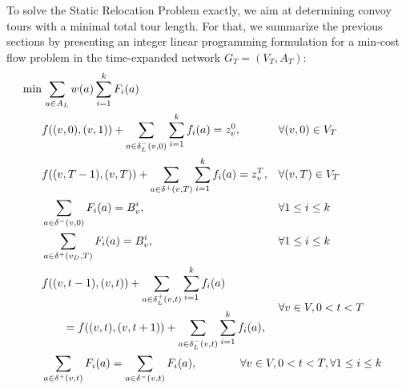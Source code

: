 \documentclass[english]{llncs}
\numberwithin{sublemma}{lemma}
\newcommand{\fc}{\ensuremath{f}}
\newcommand{\fd}{\ensuremath{F}}
\newcommand{\bd}{\ensuremath{B}}
\begin{document}
To solve the Static Relocation Problem exactly, we aim at determining convoy tours with a minimal total tour length.
For that, we summarize the previous sections by presenting an integer linear programming formulation for a min-cost flow problem in the time-expanded network $G_T = (V_T, A_T)$:
\begin{subequations}\label{eq: static: min-cost flows: ilp: wo pre w back}
  \begin{flalign}
    \min& \,  \sum_{a\in A_L} w(a) \sum_{i = 1}^k \fd_i(a)                                                                                                      \label{eq: static: min-cost flows: ilp: wo pre w back: 1}\\
    & \fc((v, 0), (v, 1)) + \sum_{a\in \delta^-_L(v,0)} \sum_{i=1}^k \fc_i(a) = z_v^0,                           && \forall (v,0) \in V_T                       \label{eq: static: min-cost flows: ilp: wo pre w back: 10}\\
    & \fc((v,T-1),(v,T)) + \sum_{a\in \delta^+(v,T)} \sum_{i=1}^k \fc_i(a) = z_v^T,                              && \forall (v,T) \in V_T                       \label{eq: static: min-cost flows: ilp: wo pre w back: 11}\\
    & \sum_{a\in \delta^-(v, 0)} \fd_i(a) = \bd_v^i,                                                             && \forall 1 \leq i \leq k                     \label{eq: static: min-cost flows: ilp: wo pre w back: 12}\\
    & \sum_{a\in \delta^+(v_D,T)} \fd_i(a) = \bd_v^i,                                                            && \forall 1 \leq i \leq k                     \label{eq: static: min-cost flows: ilp: wo pre w back: 13}\\
    & 
    \begin{aligned}
    \fc((v&, t-1), (v, t)) + \sum_{a\in \delta^+_L(v,t)} \sum_{i=1}^k \fc_i(a) \\
        &= \fc((v, t), (v, t+1)) + \sum_{a \in \delta^-_L(v,t)} \sum_{i=1}^k \fc_i(a),
    \end{aligned}
                                                                                                                &&  \forall v \in V, 0 < t < T                  \label{eq: static: min-cost flows: ilp: wo pre w back: 14}\\
    & \sum_{a\in \delta^+(v,t)} \fd_i(a) = \sum_{a\in \delta^-(v,t)} \fd_i(a),                && \hspace{-1.2cm} \forall v \in V, 0 < t < T, \forall 1 \leq i \leq k    \label{eq: static: min-cost flows: ilp: wo pre w back: 15}\\

\end{flalign}
\end{subequations}
\end{document}

